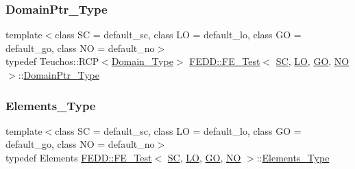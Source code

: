 \mbox{\label{classFEDD_1_1FE__Test_a1020475c408a64c7926feb8dded7f0c3}} 
\subsubsection{\texorpdfstring{Domain\+Ptr\+\_\+\+Type}{DomainPtr\_Type}}
{\footnotesize\ttfamily template$<$class SC  = default\+\_\+sc, class LO  = default\+\_\+lo, class GO  = default\+\_\+go, class NO  = default\+\_\+no$>$ \\
typedef Teuchos\+::\+R\+CP$<$\hyperlink{classFEDD_1_1FE__Test_a5e414af507a141db0961c32bf6b19825}{Domain\+\_\+\+Type}$>$ \hyperlink{classFEDD_1_1FE__Test}{F\+E\+D\+D\+::\+F\+E\+\_\+\+Test}$<$ \hyperlink{fe__test__laplace_8cpp_a79c7e86a57edbb2a5a53242bcd04e41e}{SC}, \hyperlink{fe__test__laplace_8cpp_ad6a38c9f07d3fd633eefca5bccad8410}{LO}, \hyperlink{fe__test__laplace_8cpp_afa2946b509009b4f45eb04bd8c5b27d9}{GO}, \hyperlink{fe__test__laplace_8cpp_a5e24f37b28787429872b6ecb1d0417ce}{NO} $>$\+::\hyperlink{classFEDD_1_1FE__Test_a1020475c408a64c7926feb8dded7f0c3}{Domain\+Ptr\+\_\+\+Type}}

\mbox{\label{classFEDD_1_1FE__Test_a73f1a4ecb41cbeec1be473d71efe022d}} 
\subsubsection{\texorpdfstring{Elements\+\_\+\+Type}{Elements\_Type}}
{\footnotesize\ttfamily template$<$class SC  = default\+\_\+sc, class LO  = default\+\_\+lo, class GO  = default\+\_\+go, class NO  = default\+\_\+no$>$ \\
typedef Elements \hyperlink{classFEDD_1_1FE__Test}{F\+E\+D\+D\+::\+F\+E\+\_\+\+Test}$<$ \hyperlink{fe__test__laplace_8cpp_a79c7e86a57edbb2a5a53242bcd04e41e}{SC}, \hyperlink{fe__test__laplace_8cpp_ad6a38c9f07d3fd633eefca5bccad8410}{LO}, \hyperlink{fe__test__laplace_8cpp_afa2946b509009b4f45eb04bd8c5b27d9}{GO}, \hyperlink{fe__test__laplace_8cpp_a5e24f37b28787429872b6ecb1d0417ce}{NO} $>$\+::\hyperlink{classFEDD_1_1FE__Test_a73f1a4ecb41cbeec1be473d71efe022d}{Elements\+\_\+\+Type}}

